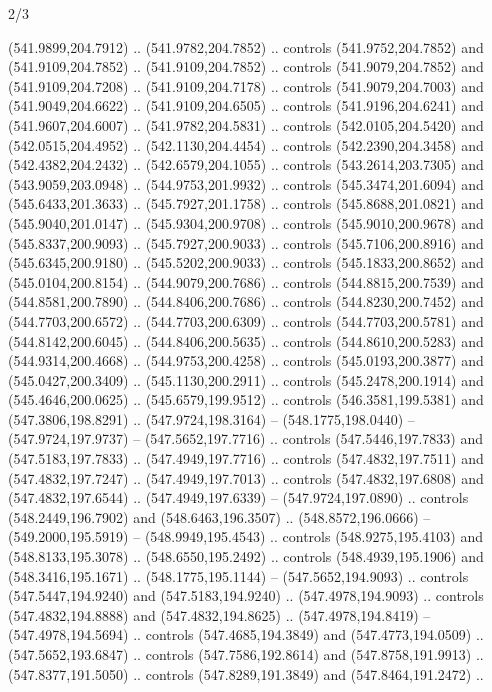 \begin{flagdescription}{2/3}
\begin{scope}[xshift=0.5\flaglength,yshift=0.5\flagwidth,scale=\flagwidth/495.65]
\begin{scope}[y=0.8pt, x=0.8pt, yscale=-1,shift={(-463.76,-309.78)}]
  (541.9899,204.7912) .. (541.9782,204.7852) .. controls (541.9752,204.7852) and
  (541.9109,204.7852) .. (541.9109,204.7852) .. controls (541.9079,204.7852) and
  (541.9109,204.7208) .. (541.9109,204.7178) .. controls (541.9079,204.7003) and
  (541.9049,204.6622) .. (541.9109,204.6505) .. controls (541.9196,204.6241) and
  (541.9607,204.6007) .. (541.9782,204.5831) .. controls (542.0105,204.5420) and
  (542.0515,204.4952) .. (542.1130,204.4454) .. controls (542.2390,204.3458) and
  (542.4382,204.2432) .. (542.6579,204.1055) .. controls (543.2614,203.7305) and
  (543.9059,203.0948) .. (544.9753,201.9932) .. controls (545.3474,201.6094) and
  (545.6433,201.3633) .. (545.7927,201.1758) .. controls (545.8688,201.0821) and
  (545.9040,201.0147) .. (545.9304,200.9708) .. controls (545.9010,200.9678) and
  (545.8337,200.9093) .. (545.7927,200.9033) .. controls (545.7106,200.8916) and
  (545.6345,200.9180) .. (545.5202,200.9033) .. controls (545.1833,200.8652) and
  (545.0104,200.8154) .. (544.9079,200.7686) .. controls (544.8815,200.7539) and
  (544.8581,200.7890) .. (544.8406,200.7686) .. controls (544.8230,200.7452) and
  (544.7703,200.6572) .. (544.7703,200.6309) .. controls (544.7703,200.5781) and
  (544.8142,200.6045) .. (544.8406,200.5635) .. controls (544.8610,200.5283) and
  (544.9314,200.4668) .. (544.9753,200.4258) .. controls (545.0193,200.3877) and
  (545.0427,200.3409) .. (545.1130,200.2911) .. controls (545.2478,200.1914) and
  (545.4646,200.0625) .. (545.6579,199.9512) .. controls (546.3581,199.5381) and
  (547.3806,198.8291) .. (547.9724,198.3164) -- (548.1775,198.0440) --
  (547.9724,197.9737) -- (547.5652,197.7716) .. controls (547.5446,197.7833) and
  (547.5183,197.7833) .. (547.4949,197.7716) .. controls (547.4832,197.7511) and
  (547.4832,197.7247) .. (547.4949,197.7013) .. controls (547.4832,197.6808) and
  (547.4832,197.6544) .. (547.4949,197.6339) -- (547.9724,197.0890) .. controls
  (548.2449,196.7902) and (548.6463,196.3507) .. (548.8572,196.0666) --
  (549.2000,195.5919) -- (548.9949,195.4543) .. controls (548.9275,195.4103) and
  (548.8133,195.3078) .. (548.6550,195.2492) .. controls (548.4939,195.1906) and
  (548.3416,195.1671) .. (548.1775,195.1144) -- (547.5652,194.9093) .. controls
  (547.5447,194.9240) and (547.5183,194.9240) .. (547.4978,194.9093) .. controls
  (547.4832,194.8888) and (547.4832,194.8625) .. (547.4978,194.8419) --
  (547.4978,194.5694) .. controls (547.4685,194.3849) and (547.4773,194.0509) ..
  (547.5652,193.6847) .. controls (547.7586,192.8614) and (547.8758,191.9913) ..
  (547.8377,191.5050) .. controls (547.8289,191.3849) and (547.8464,191.2472) ..

\end{scope}
\end{scope}
\end{flagdescription}

